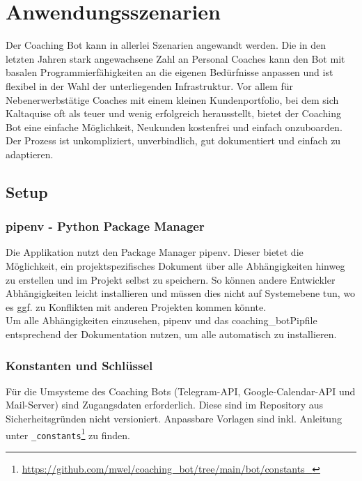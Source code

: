 \label{Anwendungsszenarien}
\chapter{Anwendungsszenarien}

Der Coaching Bot kann in allerlei Szenarien angewandt werden. Die in den letzten Jahren stark angewachsene Zahl an Personal Coaches kann den Bot mit basalen Programmierfähigkeiten an die eigenen Bedürfnisse anpassen und ist flexibel in der Wahl der unterliegenden Infrastruktur. Vor allem für Nebenerwerbstätige Coaches mit einem kleinen Kundenportfolio, bei dem sich Kaltaquise oft als teuer und wenig erfolgreich herausstellt, bietet der Coaching Bot eine einfache Möglichkeit, Neukunden kostenfrei und einfach onzuboarden. Der Prozess ist unkompliziert, unverbindlich, gut dokumentiert und einfach zu adaptieren. 

\section{Setup} \label{Anwendungsszenarien: Setup}

        \subsection{pipenv - Python Package Manager}
            Die Applikation nutzt den Package Manager pipenv. Dieser bietet die Möglichkeit, ein projektspezifisches Dokument über alle Abhängigkeiten hinweg zu erstellen und im Projekt selbst zu speichern. So können andere Entwickler Abhängigkeiten leicht installieren und müssen dies nicht auf Systemebene tun, wo es ggf. zu Konflikten mit anderen Projekten kommen könnte.\\
            Um alle Abhängigkeiten einzusehen, pipenv \cite{pipenv} und das coaching\_bot\/Pipfile entsprechend der Dokumentation nutzen, um alle automatisch zu installieren.

        \subsection{Konstanten und Schlüssel}
            Für die Umsysteme des Coaching Bots (Telegram-API, Google-Calendar-API und Mail-Server) sind Zugangsdaten erforderlich. Diese sind im Repository \cite{repo} aus Sicherheitsgründen nicht versioniert. Anpassbare Vorlagen sind inkl. Anleitung unter \verb|_constants|\footnote{\url{https://github.com/mwel/coaching_bot/tree/main/bot/constants_}} zu finden.


